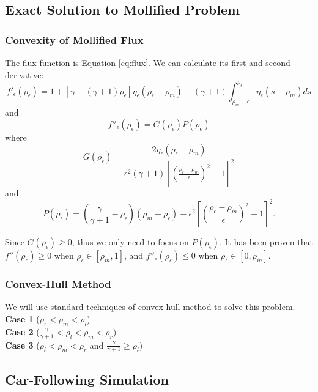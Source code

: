 \documentclass[10pt]{article}
\begin{document}
\subsection{Exact Solution to Mollified Problem}
\subsubsection{Convexity of Mollified Flux}

The flux function is Equation \ref{eq:flux}. We can calculate its first and second derivative:
\[
f'_\epsilon(\rho_\epsilon)=1+[\gamma-(\gamma+1)
\rho_\epsilon]\eta_\epsilon(\rho_\epsilon-\rho_m)-(\gamma+1)\int_{\rho_m-\epsilon}^{\rho_\epsilon}\eta_\epsilon(s-\rho_m) ds
\]
and
\[
f''_\epsilon(\rho_\epsilon)=G(\rho_\epsilon)P(\rho_\epsilon)
\]
where
\[G(\rho_\epsilon)=\frac{2\eta_\epsilon(\rho_\epsilon-\rho_m)}{\epsilon^2(\gamma+1)[(\frac{\rho_\epsilon-\rho_m}{\epsilon})^2-1]^2}
\]
and
\[P(\rho_\epsilon)=(\frac{\gamma}{\gamma+1}-\rho_\epsilon)(\rho_m-\rho_\epsilon)-\epsilon^2[(\frac{\rho_\epsilon-\rho_m}{\epsilon})^2-1]^2.
\]

Since $G(\rho_\epsilon)\geq 0$, thus we only need to focus on $P(\rho_\epsilon)$. It has been proven that $f''(\rho_\epsilon)\geq 0$ when $\rho_\epsilon\in [\rho_m,1]$, and $f''_\epsilon(\rho_\epsilon)\leq 0$ when $\rho_\epsilon\in[0,\rho_m]$.
\subsubsection{Convex-Hull Method}

We will use standard techniques of convex-hull method to solve this problem.
\\

{\bf Case 1} ($\rho_r<\rho_m<\rho_l$)
\\

\vskip 1cm
{\bf Case 2} ($\frac{\gamma}{\gamma+1}<\rho_l<\rho_m<\rho_r$)
\\

\vskip 1cm
{\bf Case 3} ($\rho_l<\rho_m<\rho_r$ and $\frac{\gamma}{\gamma+1}\geq \rho_l$)
\\

\vskip 1cm
\subsection{Car-Following Simulation}
\end{document}
